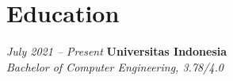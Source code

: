 \documentclass[../main.tex]{subfiles}
\begin{document}
\section{Education}

\begin{twocolentry}{
    \small
    \textit{July 2021 – Present}
}
    \textbf{Universitas Indonesia} \\
    \textit{Bachelor of Computer Engineering, 3.78/4.0}
\end{twocolentry}
\end{document}
